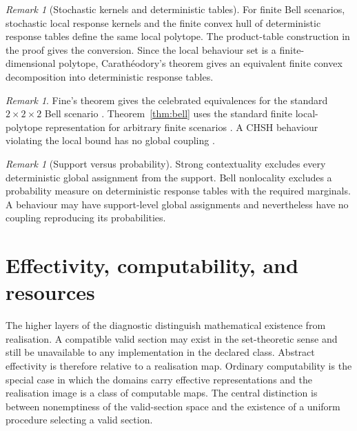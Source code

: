 \documentclass[11pt]{article}
\theoremstyle{plain}
\theoremstyle{definition}
\theoremstyle{remark}
\newtheorem{remark}[theorem]{Remark}
\begin{document}
\begin{remark}[Stochastic kernels and deterministic tables]
For finite Bell scenarios, stochastic local response kernels and the finite
convex hull of deterministic response tables define the same local polytope. The
product-table construction in the proof gives the conversion. Since the local
behaviour set is a finite-dimensional polytope, Carath\'eodory's theorem gives
an equivalent finite convex decomposition into deterministic response tables.
\end{remark}

\begin{remark}
Fine's theorem gives the celebrated equivalences for the standard
$2\times2\times2$ Bell scenario \cite{fine}. Theorem~\ref{thm:bell} uses the
standard finite local-polytope representation for arbitrary finite scenarios
\cite{pitowsky}. A CHSH behaviour violating the local bound has no global coupling
\cite{chsh}.
\end{remark}

\begin{remark}[Support versus probability]
Strong contextuality excludes every deterministic global assignment from the
support. Bell nonlocality excludes a probability measure on deterministic
response tables with the required marginals. A behaviour may have support-level
global assignments and nevertheless have no coupling reproducing its
probabilities.
\end{remark}

\section{Effectivity, computability, and resources}\label{sec:effect}

The higher layers of the diagnostic distinguish mathematical existence from
realisation. A compatible valid section may exist in the set-theoretic sense and
still be unavailable to any implementation in the declared class. Abstract
effectivity is therefore relative to a realisation map. Ordinary computability is
the special case in which the domains carry effective representations and the
realisation image is a class of computable maps. The central distinction is
between nonemptiness of the valid-section space and the existence of a uniform
procedure selecting a valid section.
\end{document}
